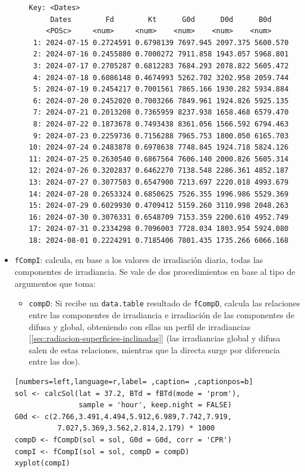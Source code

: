 \begin{itemize}
\begin{itemize}
\begin{verbatim}
Key: <Dates>
	 Dates        Fd        Kt      G0d      D0d      B0d
	<POSc>     <num>     <num>    <num>    <num>    <num>
 1: 2024-07-15 0.2724591 0.6798139 7697.945 2097.375 5600.570
 2: 2024-07-16 0.2455880 0.7000272 7911.858 1943.057 5968.801
 3: 2024-07-17 0.2705287 0.6812283 7684.293 2078.822 5605.472
 4: 2024-07-18 0.6086148 0.4674993 5262.702 3202.958 2059.744
 5: 2024-07-19 0.2454217 0.7001561 7865.166 1930.282 5934.884
 6: 2024-07-20 0.2452020 0.7003266 7849.961 1924.826 5925.135
 7: 2024-07-21 0.2013208 0.7365959 8237.938 1658.468 6579.470
 8: 2024-07-22 0.1873678 0.7493438 8361.056 1566.592 6794.463
 9: 2024-07-23 0.2259736 0.7156288 7965.753 1800.050 6165.703
10: 2024-07-24 0.2483878 0.6978638 7748.845 1924.718 5824.126
11: 2024-07-25 0.2630540 0.6867564 7606.140 2000.826 5605.314
12: 2024-07-26 0.3202837 0.6462270 7138.548 2286.361 4852.187
13: 2024-07-27 0.3077503 0.6547900 7213.697 2220.018 4993.679
14: 2024-07-28 0.2653324 0.6850625 7526.355 1996.986 5529.369
15: 2024-07-29 0.6029930 0.4709412 5159.260 3110.998 2048.263
16: 2024-07-30 0.3076331 0.6548709 7153.359 2200.610 4952.749
17: 2024-07-31 0.2334298 0.7096003 7728.034 1803.954 5924.080
18: 2024-08-01 0.2224291 0.7185406 7801.435 1735.266 6066.168
\end{verbatim}
\end{itemize}

\item \texttt{fCompI}: calcula, en base a los valores de irradiación diaria, todas las componentes de irradiancia. Se vale de dos procedimientos en base al tipo de argumentos que toma:
\begin{itemize}
\item \texttt{compD}: Si recibe un \texttt{data.table} resultado de \texttt{fCompD}, calcula las relaciones entre las componentes de irradiancia e irradiación de las componentes de difusa y global, obteniendo con ellas un perfil de irradiancias [\ref{sec:radiacion-superficies-inclinadas}] (las irradiancias global y difusa salen de estas relaciones, mientras que la directa surge por diferencia entre las dos).
\end{itemize}
\begin{lstlisting}[numbers=left,language=r,label= ,caption= ,captionpos=b]
sol <- calcSol(lat = 37.2, BTd = fBTd(mode = 'prom'),
               sample = 'hour', keep.night = FALSE)
G0d <- c(2.766,3.491,4.494,5.912,6.989,7.742,7.919,
          7.027,5.369,3.562,2.814,2.179) * 1000
compD <- fCompD(sol = sol, G0d = G0d, corr = 'CPR')
compI <- fCompI(sol = sol, compD = compD)
xyplot(compI)
\end{lstlisting}


\end{itemize}
